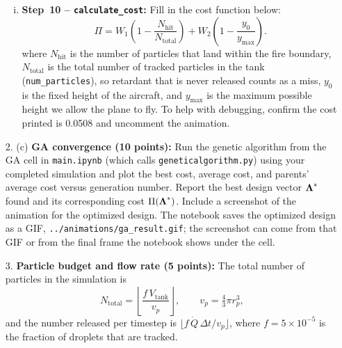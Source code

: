 \documentclass{article}
\begin{document}
\begin{enumerate}
\begin{enumerate}[(i)]
    \item \textbf{Step~10 -- \texttt{calculate\_cost}:}
          Fill in the cost function below:
          \begin{equation*} \label{eq:cost}
              \Pi = W_1\!\left(1 - \frac{N_\text{hit}}{N_\text{total}}\right)
                  + W_2\!\left(1 - \frac{y_0}{y_{\max}}\right).
          \end{equation*}
          where $N_\text{hit}$ is the number of particles that land within the fire boundary,  $N_\text{total}$ is the total number of tracked particles in the tank (\texttt{num\_particles}), so retardant that is never released counts as a miss, $y_0$ is the fixed height of the aircraft, and $y_{\text{max}}$ is the maximum possible height we allow the plane to fly.
To help with debugging, confirm the cost printed is 0.0508 and uncomment the animation.
\end{enumerate}



\item[2. (c)] \textbf{GA convergence (10 points):}
Run the genetic algorithm from the GA cell in \texttt{main.ipynb} (which calls \texttt{geneticalgorithm.py}) using your completed simulation and plot the best cost,
average cost, and parents' average cost versus generation number.
Report the best design vector $\mbox{\boldmath $\Lambda$}^*$ found and its corresponding cost $\Pi(\mbox{\boldmath $\Lambda$}^*)$.
Include a screenshot of the animation for the optimized design. The notebook saves the optimized design as a GIF, \texttt{../animations/ga\_result.gif}; the screenshot can come from that GIF or from the final frame the notebook shows under the cell.

\begin{answer}

\end{answer}



\item[3.] \textbf{Particle budget and flow rate (5 points):}
The total number of particles in the simulation is
\begin{equation}
    N_\text{total} = \left\lfloor \frac{f\,V_\text{tank}}{v_p} \right\rfloor, \qquad v_p = \tfrac{4}{3}\pi r_p^3,
    \label{eq:ntotal}
\end{equation}
and the number released per timestep is $\lfloor f\,\dot{Q}\,\Delta t / v_p \rfloor$, where $f = 5\times 10^{-5}$ is the fraction of droplets that are tracked.



\end{enumerate}
\end{document}
